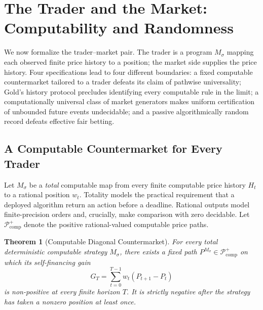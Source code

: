 \documentclass[aps,pra,reprint,superscriptaddress,amsmath,amssymb,floatfix]{revtex4-2}
\theoremstyle{plain}
\newtheorem{theorem}{Theorem}
\theoremstyle{definition}
\theoremstyle{remark}
\begin{document}
\section{The Trader and the Market: Computability and Randomness}
\label{sec:computability}

We now formalize the trader--market pair. The trader is a program
\(M_\sigma\) mapping each observed finite price history to a position; the
market side supplies the price history. Four specifications lead to four
different boundaries: a fixed computable countermarket tailored to a trader
defeats its claim of pathwise universality; Gold's history protocol precludes
identifying every computable rule in the limit; a computationally universal
class of market generators makes uniform certification of unbounded future
events undecidable; and a passive algorithmically random record defeats
effective fair betting.

\subsection{A Computable Countermarket for Every Trader}

Let \(M_\sigma\) be a \emph{total} computable map from every finite computable
price history \(H_t\) to a rational position \(w_t\). Totality models the
practical requirement that a deployed algorithm return an action before a
deadline. Rational outputs model finite-precision orders and, crucially, make
comparison with zero decidable. Let \(\mathcal P_{\mathrm{comp}}^{+}\) denote
the positive rational-valued computable price paths.

\begin{samepage}
\begin{theorem}[Computable Diagonal Countermarket]
  \label{thm:counterpath}
  For every total deterministic computable strategy \(M_\sigma\), there exists
  a fixed path \(P^{M_\sigma}\in\mathcal P_{\mathrm{comp}}^{+}\) on which its
  self-financing gain
  \[
    G_T=\sum_{t=0}^{T-1}w_t(P_{t+1}-P_t)
  \]
  is non-positive at every finite horizon \(T\). It is strictly negative after
  the strategy has taken a nonzero position at least once.
\end{theorem}
\end{samepage}
\end{document}
